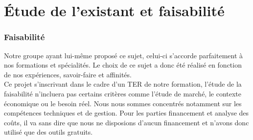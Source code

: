 \documentclass{report}
\begin{document}
		\section{Étude de l'existant et faisabilité}
		\subsubsection{Faisabilité}
		Notre groupe ayant lui-même proposé ce sujet, celui-ci s'accorde parfaitement à nos formations et spécialités. Le choix de ce sujet a donc été réalisé en fonction de nos expériences, savoir-faire et affinités.\\
Ce projet s'inscrivant dans le cadre d'un TER de notre formation, l'étude de la faisabilité n'incluera pas certains critères comme l'étude de marché, le contexte économique ou le besoin réel. 
Nous nous sommes concentrés notamment sur les compétences techniques et de gestion. Pour les parties financement et analyse des coûts, il va sans dire que nous ne disposions d'aucun financement et n'avons donc utilisé que des outils gratuits. \\
\end{document}
